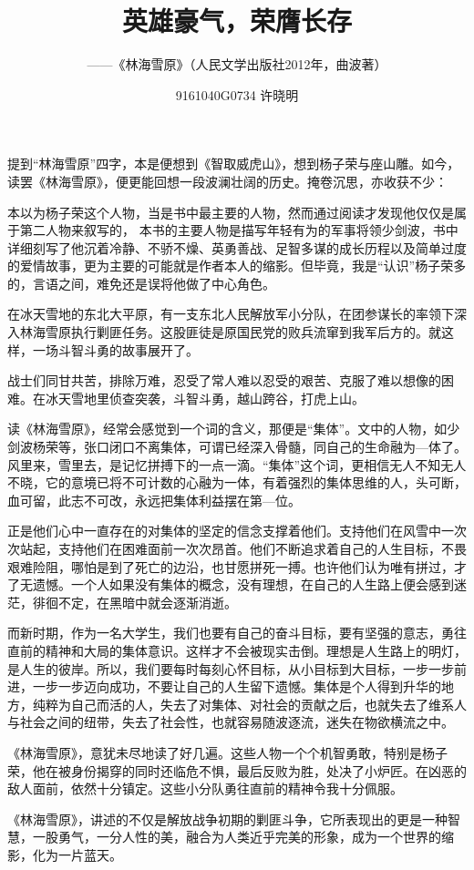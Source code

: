 \documentclass[12pt]{article}%
\title{英雄豪气，荣膺长存}
\author{——《林海雪原》（人民文学出版社2012年，曲波著）}
\date{9161040G0734 许晓明}
\begin{document}



\maketitle
提到“林海雪原”四字，本是便想到《智取威虎山》，想到杨子荣与座山雕。如今，读罢《林海雪原》，便更能回想一段波澜壮阔的历史。掩卷沉思，亦收获不少：

本以为杨子荣这个人物，当是书中最主要的人物，然而通过阅读才发现他仅仅是属于第二人物来叙写的，
本书的主要人物是描写年轻有为的军事将领少剑波，书中详细刻写了他沉着冷静、不骄不燥、英勇善战、足智多谋的成长历程以及简单过度的爱情故事，更为主要的可能就是作者本人的缩影。但毕竟，我是“认识”杨子荣多的，言语之间，难免还是误将他做了中心角色。

在冰天雪地的东北大平原，有一支东北人民解放军小分队，在团参谋长的率领下深入林海雪原执行剿匪任务。这股匪徒是原国民党的败兵流窜到我军后方的。就这样，一场斗智斗勇的故事展开了。

战士们同甘共苦，排除万难，忍受了常人难以忍受的艰苦、克服了难以想像的困难。在冰天雪地里侦查突袭，斗智斗勇，越山跨谷，打虎上山。

读《林海雪原》，经常会感觉到一个词的含义，那便是“集体”。文中的人物，如少剑波杨荣等，张口闭口不离集体，可谓已经深入骨髓，同自己的生命融为—体了。风里来，雪里去，是记忆拼搏下的一点一滴。“集体”这个词，更相信无人不知无人不晓，它的意境已将不可计数的心融为一体，有着强烈的集体思维的人，头可断，血可留，此志不可改，永远把集体利益摆在第—位。

正是他们心中一直存在的对集体的坚定的信念支撑着他们。支持他们在风雪中一次次站起，支持他们在困难面前一次次昂首。他们不断追求着自己的人生目标，不畏艰难险阻，哪怕是到了死亡的边沿，也甘愿拼死一搏。也许他们认为唯有拼过，才了无遗憾。一个人如果没有集体的概念，没有理想，在自己的人生路上便会感到迷茫，徘徊不定，在黑暗中就会逐渐消逝。

而新时期，作为一名大学生，我们也要有自己的奋斗目标，要有坚强的意志，勇往直前的精神和大局的集体意识。这样才不会被现实击倒。理想是人生路上的明灯，是人生的彼岸。所以，我们要每时每刻心怀目标，从小目标到大目标，一步一步前进，一步一步迈向成功，不要让自己的人生留下遗憾。集体是个人得到升华的地方，纯粹为自己而活的人，失去了对集体、对社会的贡献之后，也就失去了维系人与社会之间的纽带，失去了社会性，也就容易随波逐流，迷失在物欲横流之中。

《林海雪原》，意犹未尽地读了好几遍。这些人物一个个机智勇敢，特别是杨子荣，他在被身份揭穿的同时还临危不惧，最后反败为胜，处决了小炉匠。在凶恶的敌人面前，依然十分镇定。这些小分队勇往直前的精神令我十分佩服。

《林海雪原》，讲述的不仅是解放战争初期的剿匪斗争，它所表现出的更是一种智慧，一股勇气，一分人性的美，融合为人类近乎完美的形象，成为一个世界的缩影，化为一片蓝天。
\end{document}
